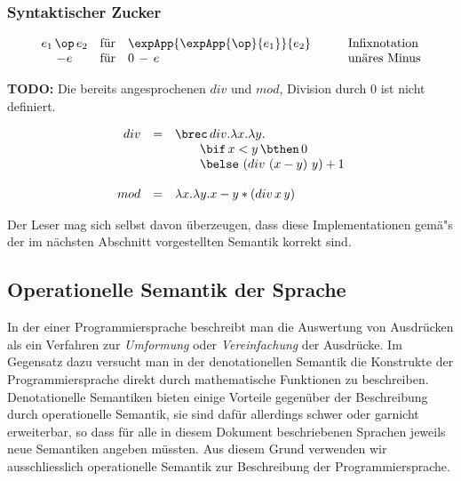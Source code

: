 
\subsubsection{Syntaktischer Zucker}

\[\begin{array}{ccll}
e_1\,\op\,e_2 & \text{f\"ur} & \expApp{\expApp{\op}{e_1}}{e_2} & \quad \quad \text{Infixnotation} \\
-e            & \text{f\"ur} & 0\,-\,e                         & \quad \quad \text{un\"ares Minus}
\end{array}\]

{\bf TODO:} Die bereits angesprochenen $div$ und $mod$, Division durch $0$ ist nicht
definiert.

\[\begin{array}{rcl}
  div & = & \brec\,div.\lambda x.\lambda y. \\
      &   & \quad \quad \bif\,x<y\,\bthen\,0 \\
      &   & \quad \quad \belse\,\left(div\,\left(x-y\right)\,y\right)+1 \\
  \\
  mod & = & \lambda x.\lambda y.x-y*\left(div\,x\,y\right)
\end{array}\]

Der Leser mag sich selbst davon \"uberzeugen, dass diese Implementationen gem\"a"s der
im n\"achsten Abschnitt vorgestellten Semantik korrekt sind.



\subsection{Operationelle Semantik der Sprache \Lf}

In der  einer Programmiersprache
beschreibt man die Auswertung von Ausdr\"ucken als ein Verfahren zur {\em Umformung} oder
{\em Vereinfachung} der Ausdr\"ucke. Im Gegensatz dazu versucht man in der denotationellen
Semantik die Konstrukte der Programmiersprache direkt durch mathematische Funktionen zu
beschreiben. Denotationelle Semantiken bieten einige Vorteile gegen\"uber der Beschreibung
durch operationelle Semantik, sie sind daf\"ur allerdings schwer oder garnicht erweiterbar,
so dass f\"ur alle in diesem Dokument beschriebenen Sprachen jeweils neue Semantiken
angeben m\"ussten. Aus diesem Grund verwenden wir ausschliesslich operationelle Semantik
zur Beschreibung der Programmiersprache.

